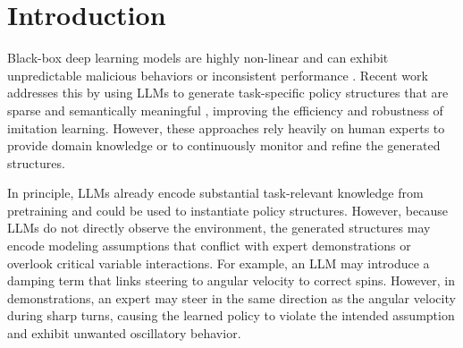 \section{Introduction}
\label{sec:introduction}

Black-box deep learning models are highly non-linear and can exhibit unpredictable malicious behaviors \cite{betley2025weird} or inconsistent performance \cite{luo2025beyond}.
Recent work addresses this by using LLMs to generate task-specific policy structures that are sparse and semantically meaningful \cite{zhu2025sample}, improving the efficiency and robustness of imitation learning.
However, these approaches rely heavily on human experts to provide domain knowledge or to continuously monitor and refine the generated structures.

In principle, LLMs already encode substantial task-relevant knowledge from pretraining and could be used to instantiate policy structures.
However, because LLMs do not directly observe the environment, the generated structures may encode modeling assumptions that conflict with expert demonstrations or overlook critical variable interactions.
For example, an LLM may introduce a damping term that links steering to angular velocity to correct spins.
However, in demonstrations, an expert may steer in the same direction as the angular velocity during sharp turns, causing the learned policy to violate the intended assumption and exhibit unwanted oscillatory behavior.


% 

